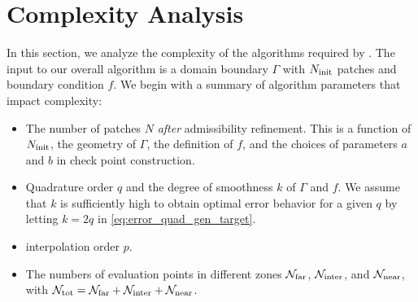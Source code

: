 
\section{Complexity Analysis\label{sec:complexity}}
In this section, we analyze the complexity of the algorithms required by \qbkix. 
The input to our overall algorithm is a domain boundary $\Gamma$ with $N_{\mathrm{init}}$ patches and boundary condition $f$.
We begin with a summary of algorithm parameters that impact complexity: 

\begin{itemize}
\item The number of patches $N$ \emph{after} admissibility refinement.  
  This is a function of $N_{\mathrm{init}}$, the geometry of $\Gamma$, the definition of $f$, and the choices of parameters $a$ and $b$ in check point construction. 
\item Quadrature order $q$ and the degree of smoothness $k$ of $\Gamma$ and $f$.
  We assume that $k$ is sufficiently high to obtain optimal error behavior for a given $q$ by letting $k=2q$ in \cref{eq:error_quad_gen_target}.
\item \qbkix interpolation order $p$. 
\item The numbers of evaluation points in different zones $\mathcal{N}_{\mathrm{far}}$, $\mathcal{N}_{\mathrm{inter}}$, and $\mathcal{N}_{\mathrm{near}}$, with $\mathcal{N}_{\mathrm{tot}} = \mathcal{N}_{\mathrm{far}}+\mathcal{N}_{\mathrm{inter}}+\mathcal{N}_{\mathrm{near}}$.
\end{itemize}

